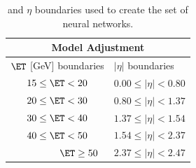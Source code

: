

\begin{table}[htb]
\begin{center}
	{\caption{\ET and $\eta$ boundaries used to create the set of neural networks.}
	\label{tab:ensemble_regions}
	\small
	\begin{tabular}{cccc}
		\hline \hline
		\multicolumn{4}{c}{Model Adjustment}                                                                 \\ \hline
		\multicolumn{2}{c|}{$\ET$ {[}GeV{]} boundaries} & \multicolumn{2}{l}{$|\eta|$ boundaries}        \\ \hline
		\multicolumn{2}{c|}{$15 \leq \ET < 20 $}        & \multicolumn{2}{l}{$0.00 \leq |\eta| < 0.80 $}   \\
		\multicolumn{2}{c|}{$20 \leq \ET < 30 $}        & \multicolumn{2}{l}{$0.80 \leq |\eta| < 1.37 $}  \\
		\multicolumn{2}{c|}{$30 \leq \ET < 40 $}        & \multicolumn{2}{l}{$1.37 \leq |\eta| < 1.54 $} \\
		\multicolumn{2}{c|}{$40 \leq \ET < 50 $}        & \multicolumn{2}{l}{$1.54 \leq |\eta| < 2.37 $} \\
		\multicolumn{2}{c|}{~~~~~~~~~$\ET \geq 50 $}    & \multicolumn{2}{l}{$2.37 \leq |\eta| < 2.47 $} \\ \hline \hline
	\end{tabular}
}
\end{center}
\end{table}